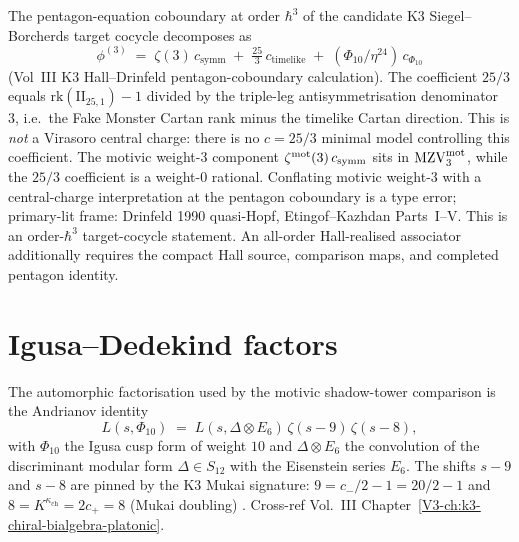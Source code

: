 \begin{remark}
\label{rem:omega-pentagon-coboundary}
The pentagon-equation coboundary at order $\hbar^3$ of the candidate
K3 Siegel--Borcherds target cocycle decomposes as
\[
 \phi^{(3)}
 \;=\;
 \zeta(3)\,c_{\mathrm{symm}}
 \;+\;
 \tfrac{25}{3}\,c_{\mathrm{timelike}}
 \;+\;
 (\Phi_{10}/\eta^{24})\,c_{\Phi_{10}}
\]
(Vol~III K3 Hall--Drinfeld pentagon-coboundary calculation). The
coefficient $25/3$ equals
$\mathrm{rk}(\mathrm{II}_{25,1}) - 1$ divided by the triple-leg
antisymmetrisation denominator~$3$, i.e.\ the Fake Monster Cartan
rank minus the timelike Cartan direction. This is \emph{not} a
Virasoro central charge: there is no $c = 25/3$ minimal model
controlling this coefficient. The motivic weight-$3$
component $\zeta^{\mathrm{mot}}(3)\,c_{\mathrm{symm}}$ sits in $\mathrm{MZV}^{\mathrm{mot}}_3$,
while the $25/3$ coefficient is a weight-$0$ rational. Conflating
motivic weight-$3$ with a central-charge interpretation at the
pentagon coboundary is a type error;
primary-lit frame: Drinfeld 1990 quasi-Hopf, Etingof--Kazhdan
Parts~I--V.  This is an order-$\hbar^3$ target-cocycle statement.  An
all-order Hall-realised associator additionally requires the compact
Hall source, comparison maps, and completed pentagon identity.
\end{remark}

\section{Igusa--Dedekind factors}
\label{sec:mst-supplement}

\begin{remark}[Andrianov factorisation $L(s,\Phi_{10}) = L(s,\Delta\otimes E_6)\,\zeta(s-9)\,\zeta(s-8)$]
\label{rem:mst-1}
The automorphic factorisation used by the motivic shadow-tower
comparison is the Andrianov identity
\[
 L(s,\Phi_{10})
 \;=\;
 L(s,\Delta\otimes E_6)\,\zeta(s-9)\,\zeta(s-8),
\]
with $\Phi_{10}$ the Igusa cusp form of weight $10$ and
$\Delta\otimes E_6$ the convolution of the discriminant modular form
$\Delta\in S_{12}$ with the Eisenstein series $E_6$. The shifts $s-9$
and $s-8$ are pinned by the K3 Mukai signature: $9 = c_-/2 - 1 = 20/2 - 1$
and $8 = K^{\kappa_{\mathrm{ch}}} = 2c_+ = 8$ (Mukai doubling) \cite{Andrianov1979,GritsenkoNikulin1998}.
Cross-ref Vol.~III Chapter~\ref{V3-ch:k3-chiral-bialgebra-platonic}.
\end{remark}

